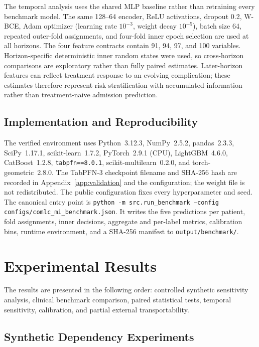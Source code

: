 \documentclass{ieeeaccess}
\begin{document}
The temporal analysis uses the shared MLP baseline rather than retraining every benchmark model. The same 128--64 encoder, ReLU activations, dropout 0.2, W-BCE, Adam optimizer (learning rate $10^{-3}$, weight decay $10^{-5}$), batch size 64, repeated outer-fold assignments, and four-fold inner epoch selection are used at all horizons. The four feature contracts contain 91, 94, 97, and 100 variables. Horizon-specific deterministic inner random states were used, so cross-horizon comparisons are exploratory rather than fully paired estimates. Later-horizon features can reflect treatment response to an evolving complication; these estimates therefore represent risk stratification with accumulated information rather than treatment-naive admission prediction.

\subsection{Implementation and Reproducibility}

The verified environment uses Python~3.12.3, NumPy~2.5.2, pandas~2.3.3, SciPy~1.17.1, scikit-learn~1.7.2, PyTorch~2.9.1 (CPU), LightGBM~4.6.0, CatBoost~1.2.8, \texttt{tabpfn==8.0.1}, scikit-multilearn~0.2.0, and torch-geometric~2.8.0. The TabPFN-3 checkpoint filename and SHA-256 hash are recorded in Appendix~\ref{app:validation} and the configuration; the weight file is not redistributed. The public configuration fixes every hyperparameter and seed. The canonical entry point is \texttt{python -m src.run\_benchmark --config configs/comlc\_mi\_benchmark.json}. It writes the five predictions per patient, fold assignments, inner decisions, aggregate and per-label metrics, calibration bins, runtime environment, and a SHA-256 manifest to \texttt{output/benchmark/}.

\section{Experimental Results}
\label{sec:results}

The results are presented in the following order: controlled synthetic sensitivity analysis, clinical benchmark comparison, paired statistical tests, temporal sensitivity, calibration, and partial external transportability.

\subsection{Synthetic Dependency Experiments}
\end{document}
